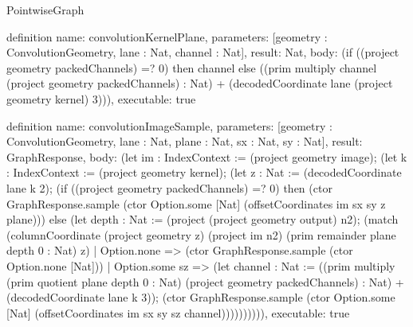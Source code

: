 \begin{lexlean}{PointwiseGraph}
\begin{semanticmodule}
definition{
  name: convolutionKernelPlane,
  parameters: [geometry : ConvolutionGeometry, lane : Nat, channel : Nat],
  result: Nat,
  body: (if ((project geometry packedChannels) =? 0) then channel else ((prim multiply channel (project geometry packedChannels) : Nat) + (decodedCoordinate lane (project geometry kernel) 3))),
  executable: true
}

definition{
  name: convolutionImageSample,
  parameters: [geometry : ConvolutionGeometry, lane : Nat, plane : Nat, sx : Nat, sy : Nat],
  result: GraphResponse,
  body: (let im : IndexContext := (project geometry image); (let k : IndexContext := (project geometry kernel); (let z : Nat := (decodedCoordinate lane k 2); (if ((project geometry packedChannels) =? 0) then (ctor GraphResponse.sample (ctor Option.some [Nat] (offsetCoordinates im sx sy z plane))) else (let depth : Nat := (project (project geometry output) n2); (match (columnCoordinate (project geometry z) (project im n2) (prim remainder plane depth 0 : Nat) z)
    | Option.none => (ctor GraphResponse.sample (ctor Option.none [Nat]))
    | Option.some sz => (let channel : Nat := ((prim multiply (prim quotient plane depth 0 : Nat) (project geometry packedChannels) : Nat) + (decodedCoordinate lane k 3)); (ctor GraphResponse.sample (ctor Option.some [Nat] (offsetCoordinates im sx sy sz channel)))))))))),
  executable: true
}


\end{semanticmodule}
\end{lexlean}
